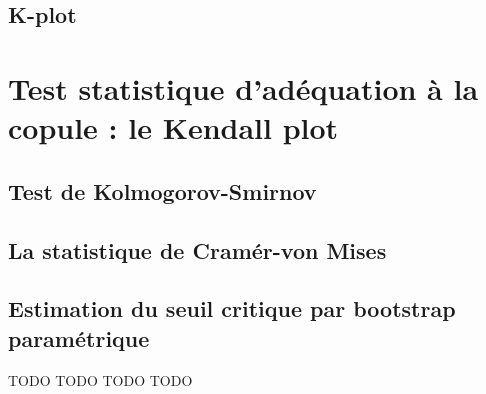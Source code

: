 \subsection{K-plot}

\section{Test statistique d'adéquation à la copule : le Kendall plot}

\subsection{Test de Kolmogorov-Smirnov}

\subsection{La statistique de Cramér-von Mises}

\subsection{Estimation du seuil critique par bootstrap paramétrique}





TODO   TODO   TODO   TODO



